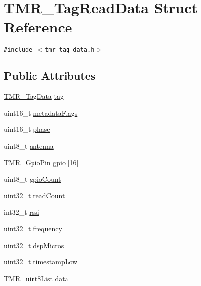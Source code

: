 \hypertarget{struct_t_m_r___tag_read_data}{
\section{TMR\_\-TagReadData Struct Reference}
\label{struct_t_m_r___tag_read_data}
}
{\tt \#include $<$tmr\_\-tag\_\-data.h$>$}

\subsection*{Public Attributes}
\begin{CompactItemize}
\item 
\hyperlink{struct_t_m_r___tag_data}{TMR\_\-TagData} \hyperlink{struct_t_m_r___tag_read_data_754ee5821d22244d4d9914b29454edce}{tag}
\item 
uint16\_\-t \hyperlink{struct_t_m_r___tag_read_data_619c292691a22b067825674a8d0a3867}{metadataFlags}
\item 
uint16\_\-t \hyperlink{struct_t_m_r___tag_read_data_6d7d9d9d7c209921f3e604ea27384576}{phase}
\item 
uint8\_\-t \hyperlink{struct_t_m_r___tag_read_data_c41eecfa15c3a592253d07b7bb5f3d05}{antenna}
\item 
\hyperlink{struct_t_m_r___gpio_pin}{TMR\_\-GpioPin} \hyperlink{struct_t_m_r___tag_read_data_f1cab2080fc1ff9415a7aee6d39dfb8e}{gpio} \mbox{[}16\mbox{]}
\item 
uint8\_\-t \hyperlink{struct_t_m_r___tag_read_data_724e6cdb0c83b942f87af518b9baa55f}{gpioCount}
\item 
uint32\_\-t \hyperlink{struct_t_m_r___tag_read_data_95c004dd01336df7165527d8aeba6cc5}{readCount}
\item 
int32\_\-t \hyperlink{struct_t_m_r___tag_read_data_6c9fd6cbdabde97ab2d487a40b174adf}{rssi}
\item 
uint32\_\-t \hyperlink{struct_t_m_r___tag_read_data_74eb597bf1f1e8935d6f4be460239e3e}{frequency}
\item 
uint32\_\-t \hyperlink{struct_t_m_r___tag_read_data_c2872c775dfede488059bad4ff47480c}{dspMicros}
\item 
uint32\_\-t \hyperlink{struct_t_m_r___tag_read_data_c14a559c7e7dfe3ff836be0ed0301279}{timestampLow}
\item 
\hyperlink{struct_t_m_r__uint8_list}{TMR\_\-uint8List} \hyperlink{struct_t_m_r___tag_read_data_442d5857239434ea3e2811f6d2f527ec}{data}
\end{CompactItemize}


